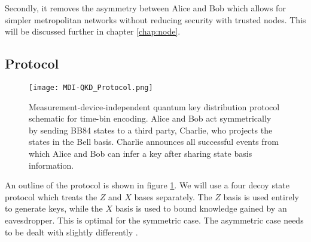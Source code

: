 Secondly, it removes the asymmetry between Alice and Bob which allows for simpler metropolitan networks without reducing security with trusted nodes. This will be discussed further in chapter \ref{chap:node}.

\subsection{Protocol}

\begin{figure}[tbp]
	\centering
	\texttt{[image: MDI-QKD\_Protocol.png]}
	\caption[MDI-QKD protocol]{Measurement-device-independent quantum key distribution protocol schematic for time-bin encoding. Alice and Bob act symmetrically by sending BB84 states to a third party, Charlie, who projects the states in the Bell basis. Charlie announces all successful events from which Alice and Bob can infer a key after sharing state basis information.}
	\label{fig:mdi_protocol}
\end{figure}

An outline of the protocol is shown in figure \ref{fig:mdi_protocol}. We will use a four decoy state protocol \cite{zhou2016} which treats the $Z$ and $X$ bases separately. The $Z$ basis is used entirely to generate keys, while the $X$ basis is used to bound knowledge gained by an eavesdropper. This is optimal for the symmetric case. The asymmetric case needs to be dealt with slightly differently \cite{wang2018}.

